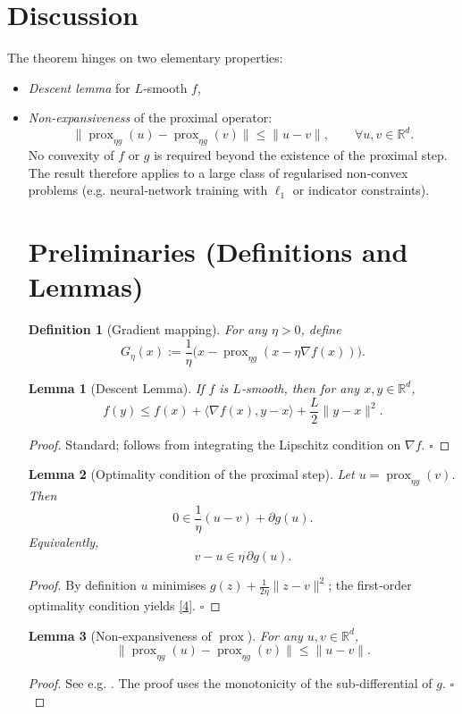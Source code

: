\documentclass{article}
\newtheorem{lemma}{Lemma}
\newtheorem{definition}{Definition}
\newcommand{\prox}{\operatorname{prox}}
\newcommand{\grad}{\nabla}
\newcommand{\R}{\mathbb{R}}
\begin{document}
\section*{Discussion}
The theorem hinges on two elementary properties:
\begin{itemize}
\item \emph{Descent lemma} for $L$‑smooth $f$,
\item \emph{Non‑expansiveness} of the proximal operator:
\[
\|\prox_{\eta g}(u)-\prox_{\eta g}(v)\|\le\|u-v\|,\qquad\forall u,v\in\R^{d}.
\tag{NE}
\]
No convexity of $f$ or $g$ is required beyond the existence of the proximal step. The result therefore applies to a large class of regularised non‑convex problems (e.g. neural‑network training with $\ell_{1}$ or indicator constraints).

\newpage
\section*{Preliminaries (Definitions and Lemmas)}
\begin{definition}[Gradient mapping]
For any $\eta>0$, define
\[
G_{\eta}(x):=\frac{1}{\eta}\bigl(x-\prox_{\eta g}(x-\eta\grad f(x))\bigr).
\]
\end{definition}
\begin{lemma}[Descent Lemma]\label{lem:descent}
If $f$ is $L$‑smooth, then for any $x,y\in\R^{d}$,
\[
f(y)\le f(x)+\langle\grad f(x),y-x\rangle+\frac{L}{2}\|y-x\|^{2}.
\tag{3}
\]
\end{lemma}
\begin{proof}
Standard; follows from integrating the Lipschitz condition on $\grad f$. \hfill $\square$
\end{proof}
\begin{lemma}[Optimality condition of the proximal step]\label{lem:prox_opt}
Let $u=\prox_{\eta g}(v)$. Then
\[
0\in\frac{1}{\eta}(u-v)+\partial g(u).
\tag{4}
\]
Equivalently,
\[
v-u\in\eta\,\partial g(u).
\]
\end{lemma}
\begin{proof}
By definition $u$ minimises $g(z)+\frac{1}{2\eta}\|z-v\|^{2}$; the first‑order optimality condition yields \eqref{4}. \hfill $\square$
\end{proof}
\begin{lemma}[Non‑expansiveness of $\prox$]\label{lem:nonexp}
For any $u,v\in\R^{d}$,
\[
\|\prox_{\eta g}(u)-\prox_{\eta g}(v)\|\le\|u-v\|.
\tag{5}
\]
\end{lemma}
\begin{proof}
See e.g. \cite{parikh2014proximal}. The proof uses the monotonicity of the sub‑differential of $g$. \hfill $\square$
\end{proof}


\end{itemize}
\end{document}

